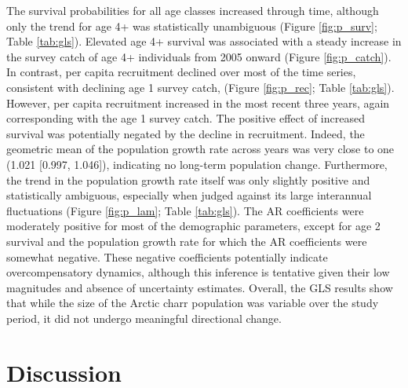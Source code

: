 \documentclass[11pt]{article}
\begin{document}
The survival probabilities for all age classes increased through time,
although only the trend for age 4+ was statistically unambiguous 
(Figure \ref{fig:p_surv}; Table \ref{tab:gls}).
Elevated age 4+ survival was associated with a steady increase in the survey catch of
age 4+ individuals from 2005 onward (Figure \ref{fig:p_catch}). 
In contrast, per capita recruitment declined over most of the time series, 
consistent with declining age 1 survey catch,
(Figure \ref{fig:p_rec}; Table \ref{tab:gls}).
However, per capita recruitment increased in the most recent three years,
again corresponding with the  age 1 survey catch.
The positive effect of increased survival was potentially negated by the decline in recruitment.
Indeed, the geometric mean of the population growth rate across years was very close to one
(1.021 [0.997, 1.046]), indicating no long-term population change.
Furthermore, the trend in the population growth rate itself was only slightly positive 
and statistically ambiguous,
especially when judged against its large interannual fluctuations
(Figure \ref{fig:p_lam}; Table \ref{tab:gls}).
The AR coefficients were moderately positive for most of the demographic parameters,
except for age 2 survival and the population growth rate 
for which the AR coefficients were somewhat negative.
These negative coefficients potentially indicate overcompensatory dynamics,
although this inference is tentative given their low magnitudes 
and absence of uncertainty estimates.
Overall, the GLS results show that while the size of the Arctic charr population 
was variable over the study period, 
it did not undergo meaningful directional change.







\section*{Discussion}
\end{document}
